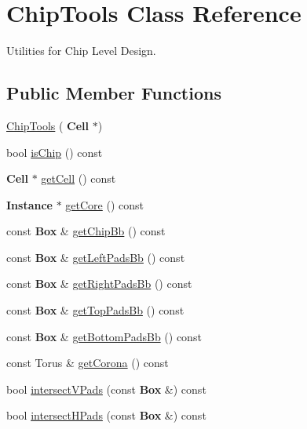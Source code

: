 \hypertarget{classKatabatic_1_1ChipTools}{}\section{Chip\+Tools Class Reference}
\label{classKatabatic_1_1ChipTools}


Utilities for Chip Level Design.  


\subsection*{Public Member Functions}
\begin{DoxyCompactItemize}
\item 
\hyperlink{classKatabatic_1_1ChipTools_a5296f5ccb380869255d774b70e237686}{Chip\+Tools} (\textbf{ Cell} $\ast$)
\item 
bool \hyperlink{classKatabatic_1_1ChipTools_ab6b7bc2b47ead460ac00a531451dc9cf}{is\+Chip} () const
\item 
\textbf{ Cell} $\ast$ \hyperlink{classKatabatic_1_1ChipTools_a55a3a88610ef1af9931e634f77f2403b}{get\+Cell} () const
\item 
\textbf{ Instance} $\ast$ \hyperlink{classKatabatic_1_1ChipTools_a8be5c4aecbe9b97ed2eb9557b046b091}{get\+Core} () const
\item 
const \textbf{ Box} \& \hyperlink{classKatabatic_1_1ChipTools_ada9182cc0bcdb47b156a29cf42d08651}{get\+Chip\+Bb} () const
\item 
const \textbf{ Box} \& \hyperlink{classKatabatic_1_1ChipTools_aa6b5ac93ecf1ee9f94f5176664dcf4bf}{get\+Left\+Pads\+Bb} () const
\item 
const \textbf{ Box} \& \hyperlink{classKatabatic_1_1ChipTools_a07e88c4c6a615019e618af327829f4d0}{get\+Right\+Pads\+Bb} () const
\item 
const \textbf{ Box} \& \hyperlink{classKatabatic_1_1ChipTools_ad31ff1dbfdf55216d684b4032a73db6b}{get\+Top\+Pads\+Bb} () const
\item 
const \textbf{ Box} \& \hyperlink{classKatabatic_1_1ChipTools_aad46c56aeb14b07fcdfe93b51c554828}{get\+Bottom\+Pads\+Bb} () const
\item 
const Torus \& \hyperlink{classKatabatic_1_1ChipTools_a19c65013cccd38e5d4169fc25454b938}{get\+Corona} () const
\item 
bool \hyperlink{classKatabatic_1_1ChipTools_a708cdae658a916324059d321fafeaa7d}{intersect\+V\+Pads} (const \textbf{ Box} \&) const
\item 
bool \hyperlink{classKatabatic_1_1ChipTools_aeead79862ba27f1219a3cbb3ef6999d2}{intersect\+H\+Pads} (const \textbf{ Box} \&) const
\end{DoxyCompactItemize}



